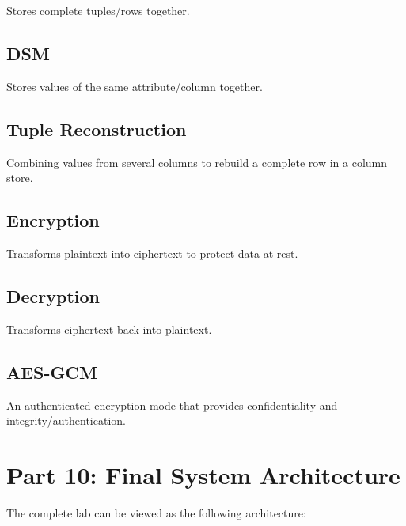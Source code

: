 \documentclass[12pt,a4paper]{article}
\begin{document}
Stores complete tuples/rows together.

\subsection*{DSM}

Stores values of the same attribute/column together.

\subsection*{Tuple Reconstruction}

Combining values from several columns to rebuild a complete row in a column store.

\subsection*{Encryption}

Transforms plaintext into ciphertext to protect data at rest.

\subsection*{Decryption}

Transforms ciphertext back into plaintext.

\subsection*{AES-GCM}

An authenticated encryption mode that provides confidentiality and integrity/authentication.

\section{Part 10: Final System Architecture}

The complete lab can be viewed as the following architecture:
\end{document}
